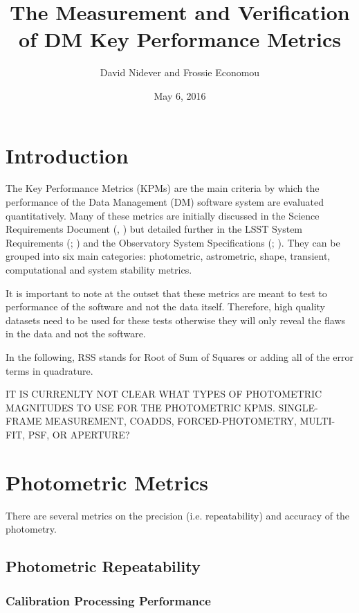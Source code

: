 \documentclass[DM,lsstdraft,toc]{lsstdoc}
\title[Measurement and Verification of KPMs]{The Measurement and Verification of DM Key Performance Metrics}
\author{David Nidever and Frossie Economou}
\date{May 6, 2016}
\begin{document}
\maketitle

\section{Introduction}\label{introduction}

The Key Performance Metrics (KPMs) are the main criteria by which the
performance of the Data Management (DM) software system are evaluated
quantitatively. Many of these metrics are initially discussed in the
Science Requirements Document (\SRD, ) but detailed further in the
LSST System Requirements (\LSR; ) and the Observatory System
Specifications (\OSS; ). They can be grouped into six main
categories: photometric, astrometric, shape, transient, computational
and system stability metrics.

It is important to note at the outset that these metrics are meant to
test to performance of the software and not the data itself. Therefore,
high quality datasets need to be used for these tests otherwise they
will only reveal the flaws in the data and not the software.

In the following, RSS stands for Root of Sum of Squares or adding all of
the error terms in quadrature.

IT IS CURRENLTY NOT CLEAR WHAT TYPES OF PHOTOMETRIC MAGNITUDES TO USE
FOR THE PHOTOMETRIC KPMS. SINGLE-FRAME MEASUREMENT, COADDS,
FORCED-PHOTOMETRY, MULTI-FIT, PSF, OR APERTURE?

\section{Photometric Metrics}\label{photometric-metrics}

There are several metrics on the precision (i.e. repeatability) and
accuracy of the photometry.

\subsection{Photometric Repeatability}\label{photometric-repeatability}

\subsubsection{Calibration Processing
Performance}\label{calibration-processing-performance}
\end{document}
